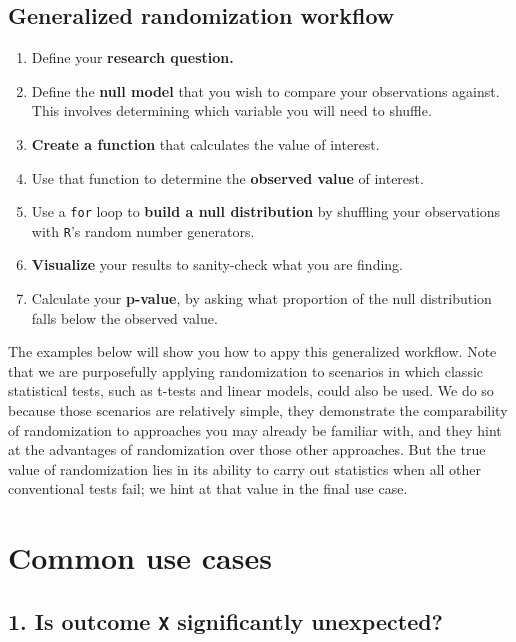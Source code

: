 \documentclass[
]{book}
\begin{document}
\hypertarget{generalized-randomization-workflow}{%
\subsection*{Generalized randomization workflow}\label{generalized-randomization-workflow}}

\begin{enumerate}
\def\labelenumi{\arabic{enumi}.}
\item
  Define your \textbf{research question.}
\item
  Define the \textbf{null model} that you wish to compare your observations against. This involves determining which variable you will need to shuffle.
\item
  \textbf{Create a function} that calculates the value of interest.
\item
  Use that function to determine the \textbf{observed value} of interest.
\item
  Use a \texttt{for} loop to \textbf{build a null distribution} by shuffling your observations with \texttt{R}'s random number generators.
\item
  \textbf{Visualize} your results to sanity-check what you are finding.
\item
  Calculate your \textbf{p-value}, by asking what proportion of the null distribution falls below the observed value.
\end{enumerate}

The examples below will show you how to appy this generalized workflow. Note that we are purposefully applying randomization to scenarios in which classic statistical tests, such as t-tests and linear models, could also be used. We do so because those scenarios are relatively simple, they demonstrate the comparability of randomization to approaches you may already be familiar with, and they hint at the advantages of randomization over those other approaches. But the true value of randomization lies in its ability to carry out statistics when all other conventional tests fail; we hint at that value in the final use case.

\hypertarget{common-use-cases}{%
\section*{Common use cases}\label{common-use-cases}}

\hypertarget{is-outcome-x-significantly-unexpected}{%
\subsection*{\texorpdfstring{1. Is outcome \texttt{X} significantly unexpected?}{1. Is outcome X significantly unexpected?}}\label{is-outcome-x-significantly-unexpected}}
\end{document}
